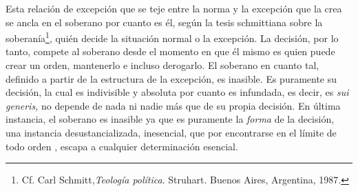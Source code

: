 Esta relación de excepción que se teje entre la norma y la excepción que la crea se ancla en el soberano por cuanto es él, según la tesis schmittiana sobre la soberanía\footnote{Cf. Carl Schmitt,\emph{Teología política}. Struhart. Buenos Aires, Argentina, 1987.}, quién decide la situación normal o la excepción. La decisión, por lo tanto, compete al soberano desde el momento en que él mismo es quien puede crear un orden, mantenerlo e incluso derogarlo. El soberano en cuanto tal, definido a partir de la estructura de la excepción, es inasible. Es puramente su decisión, la cual es indivisible y absoluta  por cuanto es infundada, es decir, es \emph{sui generis,} no depende de nada ni nadie más que de su propia decisión. En última instancia, el soberano es inasible ya que es puramente la \emph{forma} de la decisión, una instancia desustancializada, inesencial, que por encontrarse en el límite de todo orden , escapa a cualquier determinación esencial.

